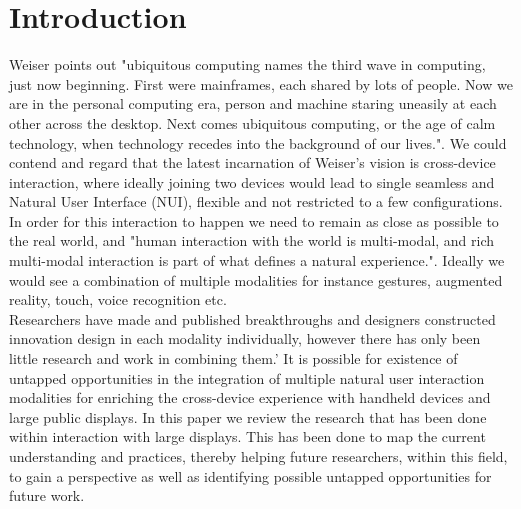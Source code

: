 \section{Introduction}
Weiser\cite{Weiser:1991} points out "ubiquitous computing names the third wave in computing, just now beginning. First were mainframes, each shared by lots of people. Now we are in the personal computing era, person and machine staring uneasily at each other across the desktop. Next comes ubiquitous computing, or the age of calm technology, when technology recedes into the background of our lives.". We could contend and regard that the latest incarnation of Weiser’s vision is cross-device interaction, where ideally joining two devices would lead to single seamless and Natural User Interface (NUI), flexible and not restricted to a few configurations.\\
In order for this interaction to happen we need to remain as close as possible to the real world, and "human interaction with the world is multi-modal, and rich multi-modal interaction is part of what defines a natural experience."\cite{Jain:2011}. Ideally we would see a combination of multiple modalities for instance gestures, augmented reality, touch, voice recognition etc. \\
Researchers have made and published breakthroughs and designers constructed innovation design in each modality individually, however there has only been little research and work in combining them.'\cite{Jain:2011} It is possible for existence of untapped opportunities in the integration of multiple natural user interaction modalities for enriching the cross-device experience with handheld devices and large public displays. 
In this paper we review the research that has been done within interaction with large displays. This has been done to map the current understanding and practices, thereby helping future researchers, within this field, to gain a perspective as well as identifying possible untapped opportunities for future work.

